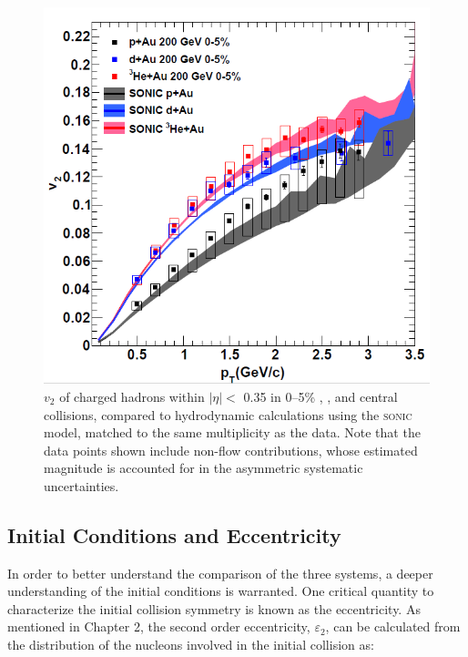 
\begin{figure}[!ht]
\begin{center}
\includegraphics[width=0.65\linewidth]{figs/three_system_comparison_result.png}
\caption{$v_2$ of charged hadrons within $|\eta| <$ 0.35 in 0--5\% \pau, \dau, and \hau central collisions, compared to hydrodynamic calculations using the \textsc{sonic} model, matched to the same multiplicity as the data. Note that the data points shown include non-flow contributions, whose estimated magnitude is accounted for in the asymmetric systematic uncertainties.}
\label{fig:all_system_hydro}
\end{center}
\end{figure}

\subsection{Initial Conditions and Eccentricity}
In order to better understand the comparison of the three systems, a deeper understanding of the initial conditions is warranted. One critical quantity to characterize the initial collision symmetry is known as the eccentricity. As mentioned in Chapter 2, the second order eccentricity, $\varepsilon_2$, can be calculated from the distribution of the nucleons involved in the initial collision as:

